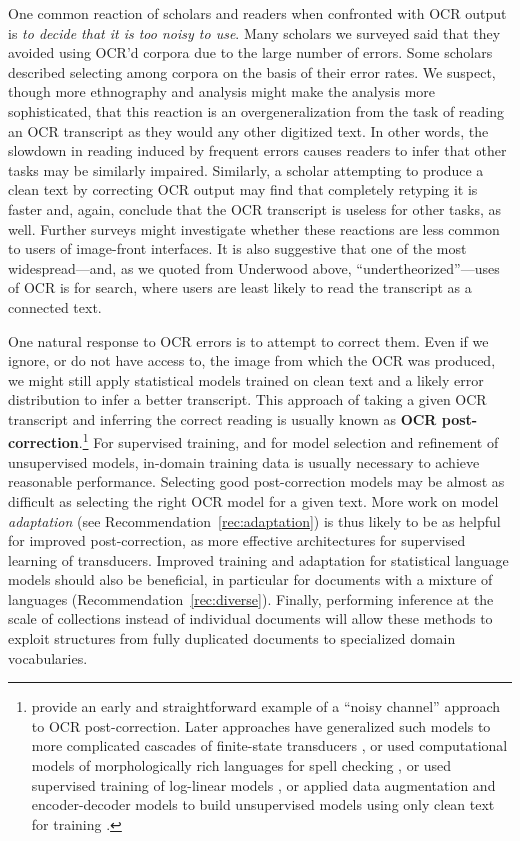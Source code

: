 \documentclass[twoside,11pt]{report}
\begin{document}
One common reaction of scholars and readers when confronted with OCR output is \emph{to decide that it is too noisy to use}. Many scholars we surveyed said that they avoided using OCR'd corpora due to the large number of errors. Some scholars described selecting among corpora on the basis of their error rates. We suspect, though more ethnography and analysis might make the analysis more sophisticated, that this reaction is an overgeneralization from the task of reading an OCR transcript as they would any other digitized text. In other words, the slowdown in reading induced by frequent errors causes readers to infer that other tasks may be similarly impaired. Similarly, a scholar attempting to produce a clean text by correcting OCR output may find that completely retyping it is faster and, again, conclude that the OCR transcript is useless for other tasks, as well. Further surveys might investigate whether these reactions are less common to users of image-front interfaces. It is also suggestive that one of the most widespread---and, as we quoted from Underwood above, ``undertheorized''---uses of OCR is for search, where users are least likely to read the transcript as a connected text.

One natural response to OCR errors is to attempt to correct them. Even if we ignore, or do not have access to, the image from which the OCR was produced, we might still apply statistical models trained on clean text and a likely error distribution to infer a better transcript. This approach of taking a given OCR transcript and inferring the correct reading is usually known as \textbf{OCR post-correction}.\footnote{\cite{tong96:_statis_approac_autom_ocr_error_correc_contex} provide an early and straightforward example of a ``noisy channel'' approach to OCR post-correction. Later approaches have generalized such models to more complicated cascades of finite-state transducers \citep{kolak2003generative,xu17:_retriev_combin_repeat_passag_improv_ocr}, or used computational models of morphologically rich languages for spell checking \citep{boschetti09:_improv_ocr_accur_class_critic_edition}, or used supervised training of log-linear models \citep{lund2011progressive}, or applied data augmentation and encoder-decoder models to build unsupervised models using only clean text for training \citep{dong18:acl}.}  For supervised training, and for model selection and refinement of unsupervised models, in-domain training data is usually necessary to achieve reasonable performance. Selecting good post-correction models may be almost as difficult as selecting the right OCR model for a given text. More work on model \emph{adaptation} (see Recommendation~\ref{rec:adaptation}) is thus likely to be as helpful for improved post-correction, as more effective architectures for supervised learning of transducers. Improved training and adaptation for statistical language models should also be beneficial, in particular for documents with a mixture of languages (Recommendation~\ref{rec:diverse}). Finally, performing inference at the scale of collections instead of individual documents will allow these methods to exploit structures from fully duplicated documents to specialized domain vocabularies.
\end{document}
